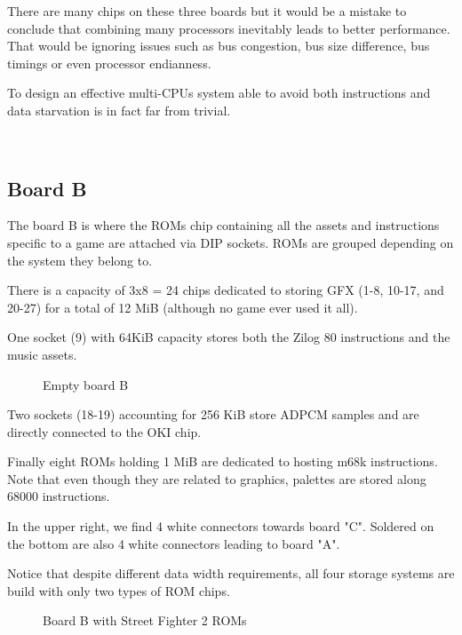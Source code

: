 There are many chips on these three boards but it would be a mistake to conclude that combining many processors inevitably leads to better performance. That would be ignoring issues such as bus congestion, bus size difference, bus timings or even processor endianness. 

To design an effective multi-CPUs system able to avoid both instructions and data starvation is in fact far from trivial.


\
\label{fig:boarda}







\subsection{Board B}
   The board B is where the ROMs chip containing all the assets and instructions specific to a game are attached via DIP sockets. ROMs are grouped depending on the system they belong to. 

   There is a capacity of 3x8 = 24 chips dedicated to storing GFX (1-8, 10-17, and 20-27) for a total of 12 MiB (although no game ever used it all).

   One socket (9) with 64KiB capacity stores both the Zilog 80 instructions and the music assets.

 
\vfill
\begin{figure}[H]
  \caption*{Empty board B}
  \end{figure}

    Two sockets (18-19) accounting for 256 KiB store ADPCM samples and are directly connected to the OKI chip.

   Finally eight ROMs holding 1 MiB are dedicated to hosting m68k instructions. Note that even though they are related to graphics, palettes are stored along 68000 instructions.

In the upper right, we find 4 white connectors towards board "C". Soldered on the bottom are also 4 white connectors leading to board "A". 


   Notice that despite different data width requirements, all four storage systems are build with only two types of ROM chips.

\vfill
\begin{figure}[H]
  \caption*{Board B with Street Fighter 2 ROMs}
  \end{figure}

